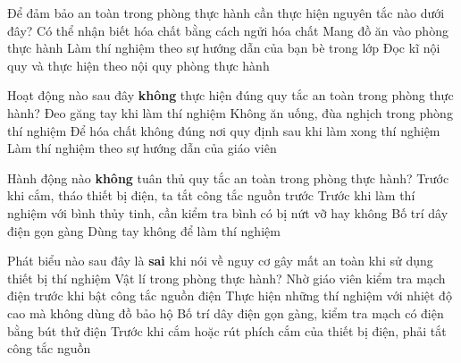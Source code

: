 \begin{ex}%
Để đảm bảo an toàn trong phòng thực hành cần thực hiện nguyên tắc nào dưới đây?
\choice
{Có thể nhận biết hóa chất bằng cách ngửi hóa chất}
{Mang đồ ăn vào phòng thực hành}
{Làm thí nghiệm theo sự hướng dẫn của bạn bè trong lớp}
{\True Đọc kĩ nội quy và thực hiện theo nội quy phòng thực hành}	
\end{ex}	
\begin{ex}%
Hoạt động nào sau đây \textbf{không} thực hiện đúng quy tắc an toàn trong phòng thực hành?
\choice
{Đeo găng tay khi làm thí nghiệm}
{Không ăn uống, đùa nghịch trong phòng thí nghiệm}
{\True Để hóa chất không đúng nơi quy định sau khi làm xong thí nghiệm}
{Làm thí nghiệm theo sự hướng dẫn của giáo viên}	
\end{ex}	
\begin{ex}%
Hành động nào \textbf{không} tuân thủ quy tắc an toàn trong phòng thực hành?
\choice
{Trước khi cắm, tháo thiết bị điện, ta tắt công tắc nguồn trước}
{Trước khi làm thí nghiệm với bình thủy tinh, cần kiểm tra bình có bị nứt vỡ hay không}
{Bố trí dây điện gọn gàng}
{\True Dùng tay không để làm thí nghiệm}	
\end{ex}	
\begin{ex}%
Phát biểu nào sau đây là \textbf{sai} khi nói về nguy cơ gây mất an toàn khi sử dụng thiết bị thí nghiệm Vật lí trong phòng thực hành?
\choice
{Nhờ giáo viên kiểm tra mạch điện trước khi bật công tắc nguồn điện}
{\True Thực hiện những thí nghiệm với nhiệt độ cao mà không dùng đồ bảo hộ}
{Bố trí dây điện gọn gàng, kiểm tra mạch có điện bằng bút thử điện}
{Trước khi cắm hoặc rút phích cắm của thiết bị điện, phải tắt công tắc nguồn}
\end{ex}






